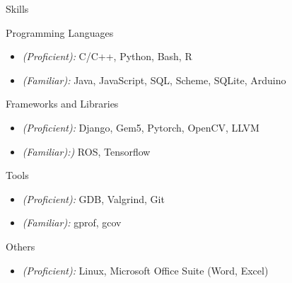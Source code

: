 \documentclass[]{mcdowellcv}
\begin{document}
\vspace*{-10pt}
\begin{cvsection}{Skills}
  \begin{cvsubsection}{Programming Languages}{}{}	
    \begin{itemize}
      \item \emph{(Proficient):} C/C++, Python, Bash, R  
      \item \emph{(Familiar):} Java, JavaScript, SQL, Scheme, SQLite, Arduino
    \end{itemize}
  \end{cvsubsection}
  \begin{cvsubsection}{Frameworks and Libraries}{}{}
    \begin{itemize}
      \item \emph{(Proficient):} Django, Gem5, Pytorch, OpenCV, LLVM
      \item \emph{(Familiar):)} ROS, Tensorflow
    \end{itemize}
  \end{cvsubsection}
  \begin{cvsubsection}{Tools}{}{}
    \begin{itemize}
      \item \emph{(Proficient):} GDB, Valgrind, Git 
      \item \emph{(Familiar):} gprof, gcov
    \end{itemize}
  \end{cvsubsection}
  \begin{cvsubsection}{Others}{}{}
    \begin{itemize}
    \item \emph{(Proficient):} Linux, Microsoft Office Suite (Word, Excel)
    \end{itemize}
  \end{cvsubsection}
\end{cvsection}
\end{document}
